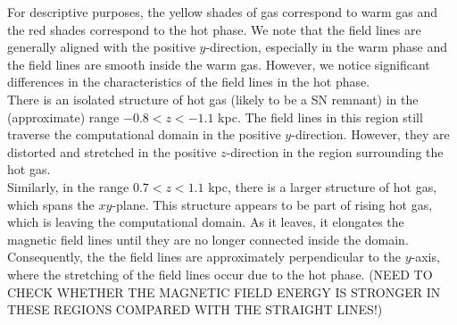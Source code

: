 \documentclass[useAMS,usenatbib]{mn2e}
\begin{document}
For descriptive purposes, the yellow shades of gas correspond to warm gas and the red shades correspond to the hot phase. We note that the field lines are generally aligned with the positive $y$-direction, especially in the warm phase and the field lines are smooth inside the warm gas. However, we notice significant differences in the characteristics of the field lines in the hot phase.\\ 
There is an isolated structure of hot gas (likely to be a SN remnant) in the (approximate) range $-0.8<z<-1.1$ kpc. The field lines in this region still traverse the computational domain in the positive $y$-direction. However, they are distorted and stretched in the positive $z$-direction in the region surrounding the hot gas.\\  
Similarly, in the range $0.7<z<1.1$ kpc, there is a larger structure of hot gas, which spans the $xy$-plane. This structure appears to be part of rising hot gas, which is leaving the computational domain. As it leaves, it elongates the magnetic field lines until they are no longer connected inside the domain. Consequently, the the field lines are approximately perpendicular to the $y$-axis, where the stretching of the field lines occur due to the hot phase. (NEED TO CHECK WHETHER THE MAGNETIC FIELD ENERGY IS STRONGER IN THESE REGIONS COMPARED WITH THE STRAIGHT LINES!)
\end{document}
